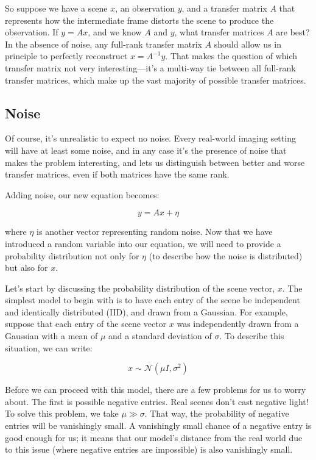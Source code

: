 So suppose we have a scene $x$, an observation $y$, and a transfer matrix $A$ that represents how the intermediate frame distorts the scene to produce the observation. If $y = Ax$, and we know $A$ and $y$, what transfer matrices $A$ are best? In the absence of noise, any full-rank transfer matrix $A$ should allow us in principle to perfectly reconstruct $x = A^{-1}y$. That makes the question of which transfer matrix not very interesting---it's a multi-way tie between all full-rank transfer matrices, which make up the vast majority of possible transfer matrices.

\subsection{Noise}

Of course, it's unrealistic to expect no noise. Every real-world imaging setting will have at least some noise, and in any case it's the presence of noise that makes the problem interesting, and lets us distinguish between better and worse transfer matrices, even if both matrices have the same rank.

Adding noise, our new equation becomes:

$$y = Ax + \eta$$

where $\eta$ is another vector representing random noise. Now that we have introduced a random variable into our equation, we will need to provide a probability distribution not only for $\eta$ (to describe how the noise is distributed) but also for $x$.

Let's start by discussing the probability distribution of the scene vector, $x$. The simplest model to begin with is to have each entry of the scene be independent and identically distributed (IID), and drawn from a Gaussian. For example, suppose that each entry of the scene vector $x$ was independently drawn from a Gaussian with a mean of $\mu$ and a standard deviation of $\sigma$. To describe this situation, we can write:

$$x \sim \mathcal{N}(\mu I, \sigma^2)$$

Before we can proceed with this model, there are a few problems for us to worry about. The first is possible negative entries. Real scenes don't cast negative light! To solve this problem, we take $\mu \gg \sigma$. That way, the probability of negative entries will be vanishingly small. A vanishingly small chance of a negative entry is good enough for us; it means that our model's distance from the real world due to this issue (where negative entries are impossible) is also vanishingly small.

